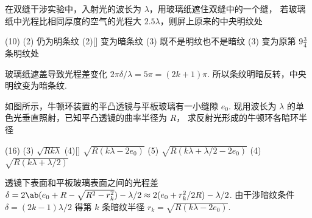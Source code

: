 \begin{problem}
  在双缝干涉实验中，入射光的波长为 $\lambda$，用玻璃纸遮住双缝中的一个缝，
  若玻璃纸中光程比相同厚度的空气的光程大 $2.5\lambda$，则屏上原来的中央明纹处
  \begin{tasks}(10)
    \task*(2) 仍为明条纹
    \task*(2)[\true] 变为暗条纹
    \task*(3) 既不是明纹也不是暗纹
    \task*(3) 变为原第 $9\frac34$ 条明纹处
  \end{tasks}
\end{problem}
\scratch[1ex]
\begin{solution}
  玻璃纸遮盖导致光程差变化
  $2\pi\delta/\lambda = 5\pi = (2k + 1)\pi$.
  所以条纹明暗反转，中央明纹变为暗条纹.
\end{solution}

\begin{textfig}
  \begin{problem}
    如图所示，牛顿环装置的平凸透镜与平板玻璃有一小缝隙 $e_0$.
    现用波长为 $\lambda$ 的单色光垂直照射，已知平凸透镜的曲率半径为 $R$，
    求反射光形成的牛顿环各暗环半径
    \begin{tasks}(16)
      \task*(3) $\sqrt{Rk\lambda}$
      \task*(4)[\true] $\sqrt{R(k\lambda - 2e_0)}$
      \task*(5) $\sqrt{R(k\lambda + \lambda/2 - 2e_0)}$
      \task*(4) $\sqrt{R(k\lambda + \lambda/2)}$
    \end{tasks}
  \end{problem}
  \textfigsplit\centering
\end{textfig}
\scratch[1ex]
\begin{solution}
  透镜下表面和平板玻璃表面之间的光程差
  $\delta = 2\ab(e_0 + R - \sqrt{R^2 - r_k^2}) - \lambda/2
  \approx 2(e_0 + r_k^2/2R) - \lambda/2$.
  由干涉暗纹条件
  $\delta = (2k - 1)\lambda/2$ 得第 $k$ 条暗纹半径 $r_k = \sqrt{R(k\lambda - 2e_0)}$.
\end{solution}

